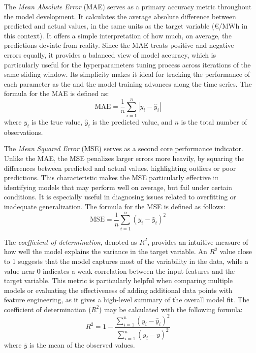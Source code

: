 \documentclass[12pt]{report} %
\begin{document}
The \textit{Mean Absolute Error} (MAE) serves as a primary accuracy metric throughout the model development. It calculates the average absolute difference between predicted and actual values, in the same units as the target variable (€/MWh in this context). It offers a simple interpretation of how much, on average, the predictions deviate from reality. Since the MAE treats positive and negative errors equally, it provides a balanced view of model accuracy, which is particularly useful for the hyperparameters tuning process across iterations of the same sliding window. Its simplicity makes it ideal for tracking the performance of each parameter as the and the model training advances along the time series. The formula for the MAE is defined as:
\[
\text{MAE} = \frac{1}{n} \sum_{i=1}^{n} \left| y_i - \hat{y}_i \right|
\]
where \( y_i \) is the true value, \( \hat{y}_i \) is the predicted value, and \( n \) is the total number of observations.

The \textit{Mean Squared Error} (MSE) serves as a second core performance indicator. Unlike the MAE, the MSE penalizes larger errors more heavily, by squaring the differences between predicted and actual values, highlighting outliers or poor predictions. This characteristic makes the MSE particularly effective in identifying models that may perform well on average, but fail under certain conditions. It is especially useful in diagnosing issues related to overfitting or inadequate generalization. The formula for the MSE is defined as follows:
\[
\text{MSE} = \frac{1}{n} \sum_{i=1}^{n} \left( y_i - \hat{y}_i \right)^2
\]

The \textit{coefficient of determination}, denoted as $R^2$, provides an intuitive measure of how well the model explains the variance in the target variable. An $R^2$ value close to 1 suggests that the model captures most of the variability in the data, while a value near 0 indicates a weak correlation between the input features and the target variable. This metric is particularly helpful when comparing multiple models or evaluating the effectiveness of adding additional data points with feature engineering, as it gives a high-level summary of the overall model fit. The coefficient of determination (\( R^2 \)) may be calculated with the following formula:
\[
R^2 = 1 - \frac{\sum_{i=1}^{n} \left( y_i - \hat{y}_i \right)^2}{\sum_{i=1}^{n} \left( y_i - \bar{y} \right)^2}
\]
where \( \bar{y} \) is the mean of the observed values.
\end{document}
